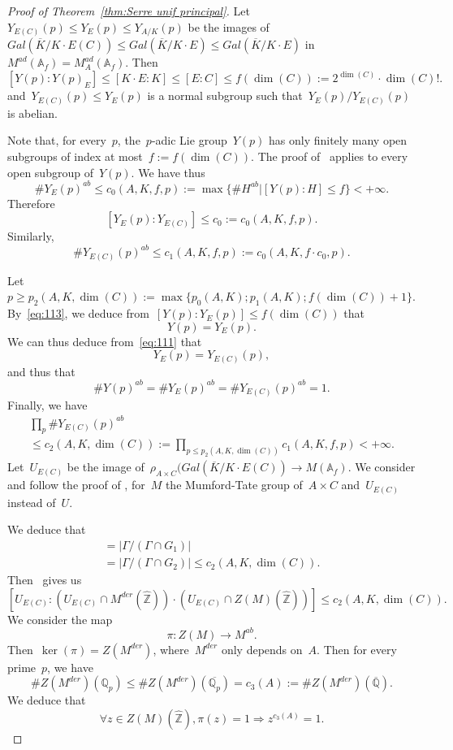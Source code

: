 \documentclass[12pt]{amsart}
\newcommand{\Z}{{\mathbb Z}}
\newcommand{\Q}{{\mathbb Q}}
\newcommand{\A}{{\mathbb A}}
\newcommand{\ol}{\overline}
\newcommand{\wh}{\widehat}
\newcommand{\abs}[1]{\left|#1\right|}
\begin{document}
\begin{proof}[Proof of Theorem~\ref{thm:Serre unif principal}]
Let~$Y_{E(C)}(p)\leq Y_E(p)\leq Y_{A/K}(p)$ be the images of~$Gal(\ol{K}/K\cdot E(C))\leq Gal(\ol{K}/K\cdot E)\leq Gal(\ol{K}/K\cdot E)$ in~$M^{ad}(\A_f)=M_A^{ad}(\A_f)$. Then
\[
[Y(p):Y(p)_E]\leq [K\cdot E:K]\leq [E:C]\leq f(\dim(C)):=2^{\dim(C)}\cdot \dim(C)!.
\]
and~$Y_{E(C)}(p)\leq Y_E(p)$ is a normal subgroup such that~$Y_E(p)/Y_{E(C)}(p)$ is abelian. 

Note that, for every~$p$, the~$p$-adic Lie group~$Y(p)$ has only finitely many open subgroups of index at most~$f:=f(\dim(C))$. The proof of~\cite[App. B (111)]{RY:IHES} applies to every open subgroup of~$Y(p)$.
We have thus
\[
\#{Y_E(p)}^{ab}\leq c_0(A,K,f,p):=
\max\{\# H^{ab}| [Y(p):H]\leq f\}<+\infty.
\]
Therefore
\[
[Y_E(p):Y_{E(C)}]\leq c_0:=c_0(A,K,f,p).
\]
Similarly,
\[
\#{Y_{E(C)}(p)}^{ab}\leq c_1(A,K,f,p):=c_0(A,K,f\cdot c_0,p).
\]

Let~$p\geq p_2(A,K,\dim(C)):=\max\{p_0(A,K);p_1(A,K);f(\dim(C))+1\}$. By~\eqref{eq:113}, we deduce from~$[Y(p):Y_E(p)]\leq f(\dim(C))$ that
\[
Y(p)=Y_E(p).
\]
We can thus deduce from~\eqref{eq:111} that
\[
Y_E(p)=Y_{E(C)}(p),
\]
and thus that
\[
\#Y(p)^{ab}=\#Y_E(p)^{ab}=\#Y_{E(C)}(p)^{ab}=1.
\]
Finally, we have
\begin{multline}
\prod_p \#{Y_{E(C)}(p)}^{ab}\\
\leq
c_2(A,K,\dim(C))
:=
\prod_{p\leq p_2(A,K,\dim(C))}  c_1(A,K,f,p)<+\infty.
\end{multline}
Let~$U_{E(C)}$ be the image of~$\rho_{A\times C}(Gal(\ol{K}/K\cdot E(C))\to M(\A_f)$.
We consider and follow the proof of \cite[App. B, \S B.4.2, p.\,326]{RY:IHES}, for~$M$ the Mumford-Tate group of~$A\times C$ and~$U_{E(C)}$ instead of~$U$. 

We deduce that 
\begin{multline}
[\Gamma:(\Gamma\cap G_1)\times (\Gamma\cap G_2)]=\abs{\Gamma/(\Gamma\cap G_1)}
\\=
\abs{\Gamma/(\Gamma\cap G_2)}
\leq c_2(A,K,\dim(C)).
\end{multline}
Then~\cite[App. B, \S B.4.2, p.\,326]{RY:IHES} gives us
\[
\left[U_{E(C)}:\left(U_{E(C)}\cap M^{der}(\widehat{\Z})\right)\cdot
\left(U_{E(C)}\cap Z(M)(\widehat{\Z})\right)\right
]\leq c_2(A,K,\dim(C)).
\]
We consider the map
\[
\pi:Z(M)\to M^{ab}.
\]
Then~$\ker(\pi)=Z(M^{der})$, where~$M^{der}$ only depends on~$A$. Then for every prime~$p$, we have
\[
\#Z(M^{der})(\Q_p)\leq \#Z(M^{der})(\ol{\Q_p})=c_3(A):=\# Z(M^{der})(\ol{\Q}).
\]
We deduce that
\[
\forall z\in Z(M)(\wh{\Z}), \pi(z)=1\Rightarrow z^{c_3(A)}=1.
\]


\end{proof}
\end{document}
